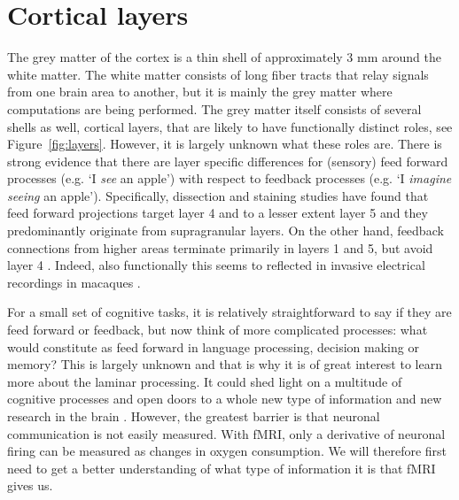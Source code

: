 \section*{Cortical layers}
The grey matter of the cortex is a thin shell of approximately 3 mm \cite{Zilles1990} around the white matter. The white matter consists of long fiber tracts that relay signals from one brain area to another, but it is mainly the grey matter where computations are being performed. The grey matter itself consists of several shells as well, cortical layers, that are likely to have functionally distinct roles, see Figure~\ref{fig:layers}. However, it is largely unknown what these roles are. %
There is strong evidence that there are layer specific differences for (sensory) feed forward processes (e.g. `I \emph{see} an apple') with respect to feedback processes (e.g. `I \emph{imagine seeing} an apple'). Specifically, dissection and staining studies have found that feed forward projections target layer 4 \cite{Felleman1991} and to a lesser extent layer 5 \cite{Constantinople2013} and they predominantly originate from supragranular layers. On the other hand, feedback connections from higher areas terminate primarily in layers 1 and 5, but avoid layer 4 \cite{Felleman1991,Anderson2009}. Indeed, also functionally this seems to reflected in invasive electrical recordings in macaques \cite{Buffalo2011,Maier2010,Maier2011,VanKerkoerle2017}. 


For a small set of cognitive tasks, it is relatively straightforward to say if they are feed forward or feedback, but now think of more complicated processes: what would constitute as feed forward in language processing, decision making or memory? This is largely unknown and that is why it is of great interest to learn more about the laminar processing. It could shed light on a multitude of cognitive processes and open doors to a whole new type of information and new research in the brain \cite{Lawrence2017}. However, the greatest barrier is that neuronal communication is not easily measured. With fMRI, only a derivative of neuronal firing can be measured as changes in oxygen consumption. We will therefore first need to get a better understanding of what type of information it is that fMRI gives us.

